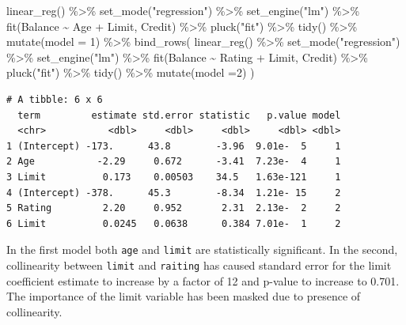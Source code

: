 \documentclass[
  letterpaper,
  DIV=11,
  numbers=noendperiod]{scrreprt}
\newenvironment{Shaded}{\begin{snugshade}}{\end{snugshade}}
\newcommand{\AttributeTok}[1]{\textcolor[rgb]{0.65,0.35,0.00}{#1}}
\newcommand{\DecValTok}[1]{\textcolor[rgb]{0.47,0.16,0.63}{#1}}
\newcommand{\FunctionTok}[1]{\textcolor[rgb]{0.02,0.16,0.49}{#1}}
\newcommand{\NormalTok}[1]{\textcolor[rgb]{0.33,0.33,0.33}{#1}}
\newcommand{\SpecialCharTok}[1]{\textcolor[rgb]{0.00,0.46,0.62}{#1}}
\newcommand{\StringTok}[1]{\textcolor[rgb]{0.00,0.50,0.00}{#1}}
\begin{document}
\begin{Shaded}
\begin{Highlighting}[]
\FunctionTok{linear\_reg}\NormalTok{() }\SpecialCharTok{\%\textgreater{}\%} 
  \FunctionTok{set\_mode}\NormalTok{(}\StringTok{"regression"}\NormalTok{) }\SpecialCharTok{\%\textgreater{}\%} 
  \FunctionTok{set\_engine}\NormalTok{(}\StringTok{"lm"}\NormalTok{) }\SpecialCharTok{\%\textgreater{}\%} 
  \FunctionTok{fit}\NormalTok{(Balance }\SpecialCharTok{\textasciitilde{}}\NormalTok{ Age }\SpecialCharTok{+}\NormalTok{ Limit, Credit) }\SpecialCharTok{\%\textgreater{}\%} 
  \FunctionTok{pluck}\NormalTok{(}\StringTok{"fit"}\NormalTok{) }\SpecialCharTok{\%\textgreater{}\%} 
  \FunctionTok{tidy}\NormalTok{() }\SpecialCharTok{\%\textgreater{}\%} \FunctionTok{mutate}\NormalTok{(}\AttributeTok{model =} \DecValTok{1}\NormalTok{) }\SpecialCharTok{\%\textgreater{}\%} 
  \FunctionTok{bind\_rows}\NormalTok{(}
    \FunctionTok{linear\_reg}\NormalTok{() }\SpecialCharTok{\%\textgreater{}\%} 
  \FunctionTok{set\_mode}\NormalTok{(}\StringTok{"regression"}\NormalTok{) }\SpecialCharTok{\%\textgreater{}\%} 
  \FunctionTok{set\_engine}\NormalTok{(}\StringTok{"lm"}\NormalTok{) }\SpecialCharTok{\%\textgreater{}\%} 
  \FunctionTok{fit}\NormalTok{(Balance }\SpecialCharTok{\textasciitilde{}}\NormalTok{ Rating }\SpecialCharTok{+}\NormalTok{ Limit, Credit) }\SpecialCharTok{\%\textgreater{}\%} 
  \FunctionTok{pluck}\NormalTok{(}\StringTok{"fit"}\NormalTok{) }\SpecialCharTok{\%\textgreater{}\%} 
  \FunctionTok{tidy}\NormalTok{() }\SpecialCharTok{\%\textgreater{}\%} \FunctionTok{mutate}\NormalTok{(}\AttributeTok{model =}\DecValTok{2}\NormalTok{)}
\NormalTok{  )}
\end{Highlighting}
\end{Shaded}

\begin{verbatim}
# A tibble: 6 x 6
  term         estimate std.error statistic   p.value model
  <chr>           <dbl>     <dbl>     <dbl>     <dbl> <dbl>
1 (Intercept) -173.      43.8        -3.96  9.01e-  5     1
2 Age           -2.29     0.672      -3.41  7.23e-  4     1
3 Limit          0.173    0.00503    34.5   1.63e-121     1
4 (Intercept) -378.      45.3        -8.34  1.21e- 15     2
5 Rating         2.20     0.952       2.31  2.13e-  2     2
6 Limit          0.0245   0.0638      0.384 7.01e-  1     2
\end{verbatim}

In the first model both \texttt{age} and \texttt{limit} are
statistically significant. In the second, collinearity between
\texttt{limit} and \texttt{raiting} has caused standard error for the
limit coefficient estimate to increase by a factor of 12 and p-value to
increase to 0.701. The importance of the limit variable has been masked
due to presence of collinearity.
\end{document}
